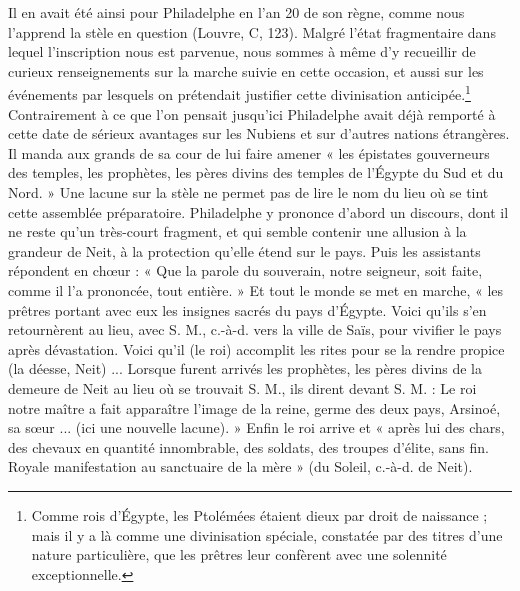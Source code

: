 \documentclass[a4paper, 11pt, oneside]{article}
\begin{document}
Il en avait été ainsi pour Philadelphe en l'an 20 de son règne, comme nous l'apprend la stèle en question (Louvre, C, 123). Malgré l'état fragmentaire dans lequel l'inscription nous est parvenue, nous sommes à même d'y recueillir de curieux renseignements sur la marche suivie en cette occasion, et aussi sur les événements par lesquels on prétendait justifier cette divinisation anticipée.\footnote{Comme rois d'Égypte, les Ptolémées étaient dieux par droit de naissance ; mais il y a là comme une divinisation spéciale, constatée par des titres d'une nature particulière, que les prêtres leur confèrent avec une solennité exceptionnelle.} Contrairement à ce que l'on pensait jusqu'ici Philadelphe avait déjà remporté à cette date de sérieux avantages sur les Nubiens et sur d'autres nations étrangères. Il manda aux grands de sa cour de lui faire amener « les épistates gouverneurs des temples, les prophètes, les pères divins des temples de l'Égypte du Sud et du Nord. » Une lacune sur la stèle ne permet pas de lire le nom du lieu où se tint cette assemblée préparatoire. Philadelphe y prononce d'abord un discours, dont il ne reste qu'un très-court fragment, et qui semble contenir une allusion à la grandeur de Neit, à la protection qu'elle étend sur le pays. Puis les assistants répondent en chœur : « Que la parole du souverain, notre seigneur, soit faite, comme il l'a prononcée, tout entière. » Et tout le monde se met en marche, « les prêtres portant avec eux les insignes sacrés du pays d'Égypte. Voici qu'ils s'en retournèrent au lieu, avec S. M., c.-à-d. vers la ville de Saïs, pour vivifier le pays après dévastation. Voici qu'il (le roi) accomplit les rites pour se la rendre propice (la déesse, Neit) ... Lorsque furent arrivés les prophètes, les pères divins de la demeure de Neit au lieu où se trouvait S. M., ils dirent devant S. M. : Le roi notre maître a fait apparaître l'image de la reine, germe des deux pays, Arsinoé, sa sœur ... (ici une nouvelle lacune). » Enfin le roi arrive et « après lui des chars, des chevaux en quantité innombrable, des soldats, des troupes d'élite, sans fin. Royale manifestation au sanctuaire de la mère » (du Soleil, c.-à-d. de Neit).
\end{document}

